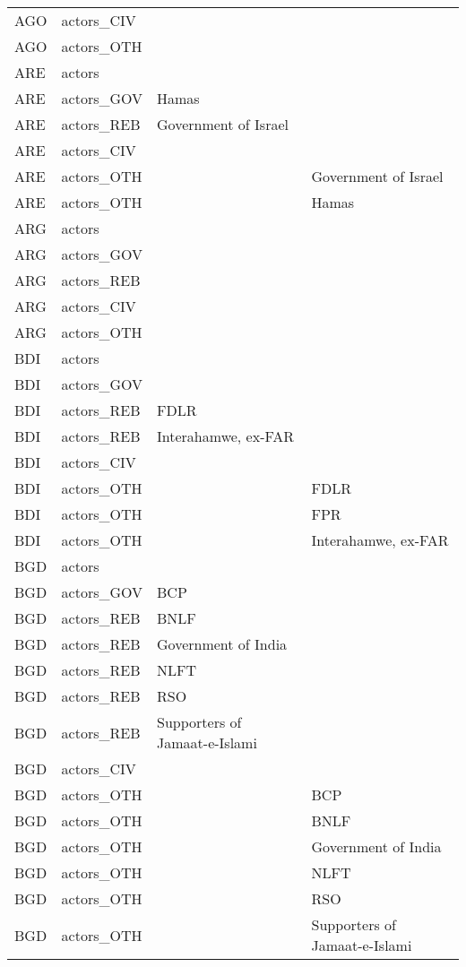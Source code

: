 \begin{table}[ht]
\begin{tabular}{llll}
  AGO & actors\_CIV &  &  \\ 
  AGO & actors\_OTH &  &  \\ 
  ARE & actors &  &  \\ 
  ARE & actors\_GOV & Hamas &  \\ 
  ARE & actors\_REB & Government of Israel &  \\ 
  ARE & actors\_CIV &  &  \\ 
  ARE & actors\_OTH &  & Government of Israel \\ 
  ARE & actors\_OTH &  & Hamas \\ 
  ARG & actors &  &  \\ 
  ARG & actors\_GOV &  &  \\ 
  ARG & actors\_REB &  &  \\ 
  ARG & actors\_CIV &  &  \\ 
  ARG & actors\_OTH &  &  \\ 
  BDI & actors &  &  \\ 
  BDI & actors\_GOV &  &  \\ 
  BDI & actors\_REB & FDLR &  \\ 
  BDI & actors\_REB & Interahamwe, ex-FAR &  \\ 
  BDI & actors\_CIV &  &  \\ 
  BDI & actors\_OTH &  & FDLR \\ 
  BDI & actors\_OTH &  & FPR \\ 
  BDI & actors\_OTH &  & Interahamwe, ex-FAR \\ 
  BGD & actors &  &  \\ 
  BGD & actors\_GOV & BCP &  \\ 
  BGD & actors\_REB & BNLF &  \\ 
  BGD & actors\_REB & Government of India &  \\ 
  BGD & actors\_REB & NLFT &  \\ 
  BGD & actors\_REB & RSO &  \\ 
  BGD & actors\_REB & Supporters of Jamaat-e-Islami &  \\ 
  BGD & actors\_CIV &  &  \\ 
  BGD & actors\_OTH &  & BCP \\ 
  BGD & actors\_OTH &  & BNLF \\ 
  BGD & actors\_OTH &  & Government of India \\ 
  BGD & actors\_OTH &  & NLFT \\ 
  BGD & actors\_OTH &  & RSO \\ 
  BGD & actors\_OTH &  & Supporters of Jamaat-e-Islami \\ 

\end{tabular}
\end{table}
